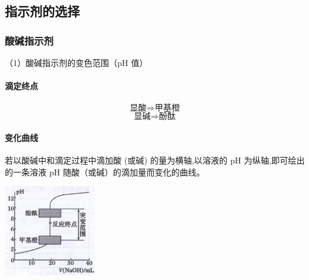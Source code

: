 \documentclass[10pt,cn]{elegantbook}
\begin{document}
	
\subsection{指示剂的选择}

\subsubsection{酸碱指示剂}

（1）酸碱指示剂的变色范围（pH 值） 

\begin{center}
\end{center}
\paragraph{滴定终点}

\[\mbox{显酸}\Rightarrow\mbox{甲基橙}\]
\[\mbox{显碱}\Rightarrow\mbox{酚酞}\]
\paragraph{变化曲线}

若以酸碱中和滴定过程中滴加酸 (或碱) 的量为横轴,以溶液的 \(\mathrm{{pH}}\) 为纵轴,即可绘出的一条溶液 \(\mathrm{{pH}}\) 随酸（或碱）的滴加量而变化的曲线。

\begin{center}
	\includegraphics[max width=0.3\textwidth]{image/c5.jpg}
\end{center}
\end{document}
